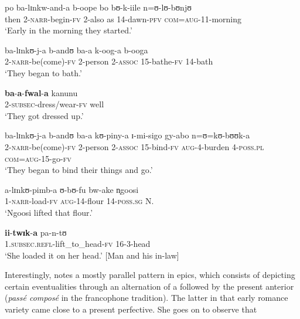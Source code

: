 \begin{exe}
\ex \label{exSubsecutivePreparationResult}
\begin{xlist}
\ex \gll po ba-lɪnkw-and-a b-oope bo bʊ-k-iile n=ʊ-lʊ-bʊnjʊ\\
then 2-\textsc{narr}-begin-\textsc{fv} 2-also as 14-dawn-\textsc{pfv} \textsc{com}=\textsc{aug}-11-morning\\
\glt \lq Early in the morning they started.'

\ex \label{exSubsecutivePreparationResultSentence2}\gll ba-lɪnkʊ-j-a b-andʊ ba-a k-oog-a b-ooga\\
2-\textsc{narr}-be(come)-\textsc{fv} 2-person 2-\textsc{assoc} 15-bathe-\textsc{fv} 14-bath\\
\glt \lq They began to bath.'

\ex \label{exSubsecutivePreparationResultSentence3}\gll \textbf{ba}-\textbf{a}-\textbf{fwal}-\textbf{a} kanunu\\
2-\textsc{subsec}-dress/wear-\textsc{fv} well\\
\glt \lq They got dressed up.'

\ex \label{exSubsecutivePreparationResultSentence4}\gll ba-lɪnkʊ-j-a b-andʊ ba-a kʊ-piny-a ɪ-mi-sigo gy-abo n=ʊ=kʊ-bʊʊk-a\\
2-\textsc{narr}-be(come)-\textsc{fv} 2-person 2-\textsc{assoc} 15-bind-\textsc{fv} \textsc{aug}-4-burden 4-\textsc{poss.pl} \textsc{com}=\textsc{aug}-15-go-\textsc{fv}\\
\glt \lq They began to bind their things and go.'

\ex \label{exSubsecutivePreparationResultSentence5} \gll a-lɪnkʊ-pimb-a ʊ-bʊ-fu bw-ake n̩goosi\\
1-\textsc{narr}-load-\textsc{fv} \textsc{aug}-14-flour 14-\textsc{poss.sg} N.\\
\glt \lq Ngoosi lifted that flour.'

\ex \label{exSubsecutivePreparationResultSentence6} \gll \textbf{ii}-\textbf{twɪk}-\textbf{a} pa-n-tʊ\\
1.\textsc{subsec}.\textsc{refl}-lift\_to\_head-\textsc{fv} 16-3-head\\
\glt \lq She loaded it on her head.' [Man and his in-law]
\end{xlist}
\end{exe}
Interestingly, \citet[ch. 6]{FleischmanS1990} notes a mostly parallel pattern in  epics, which consists of depicting certain eventualities through an alternation of a  followed by the present anterior (\textit{passé composé} in the francophone tradition). The latter in that early romance variety came close to a present perfective. She goes on to observe that

